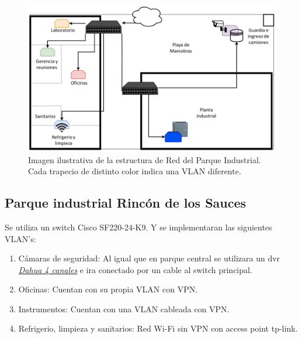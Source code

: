 \documentclass[11pt]{article}
\begin{document}
        \begin{figure}[H]
            \centering
            \includegraphics[width=\textwidth]{Figure/Planta_de_parque.png}
            \caption{Imagen ilustrativa de la estructura de Red del Parque Industrial. Cada trapecio de distinto color indica una VLAN diferente.}
        \end{figure}
        

    \subsection{Parque industrial Rincón de los Sauces}

    Se utiliza un switch Cisco SF220-24-K9. Y se implementaran las siguientes VLAN's: 

    \begin{enumerate}
        \item Cámaras de seguridad: Al igual que en parque central se utilizara un dvr 
        \href{https://articulo.mercadolibre.com.ar/MLA-658974667-nvr-dvr-dahua-4-canales-penta-hdcvi-xvr-1a04-5-ch-5x1-qr-ps2-_JM#position=1&type=item&tracking_id=c1ba311d-e835-4420-9ba9-f01382834064}{\textit{Dahua 4 canales}} e ira conectado por un cable al switch principal.
        \item Oficinas: Cuentan con su propia VLAN con VPN.
        \item Instrumentos: Cuentan con una VLAN cableada con VPN.
        \item Refrigerio, limpieza y sanitarios: Red Wi-Fi sin VPN con access point tp-link. 
    \end{enumerate}
\end{document}

